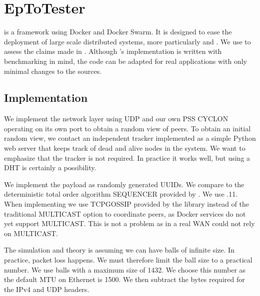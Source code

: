 \section{EpToTester}
\label{sec:epto}
\eptotester is a framework using Docker and Docker Swarm. It is designed to ease the deployment of large scale distributed systems, more particularly \jgroups and \epto. We use \eptotester to assess the claims made in \autocite{matos2015epto}. Although \epto's implementation is written with benchmarking in mind, the code can be adapted for real applications with only minimal changes to the sources.
\subsection{Implementation}
We implement the network layer using UDP and our own PSS CYCLON operating on its own port to obtain a random view of peers. To obtain an initial random view, we contact an independent tracker implemented as a simple Python web server that keeps track of dead and alive nodes in the system. We want to emphasize that the tracker is not required. In practice it works well, but using a DHT is certainly a possibility.

We implement the payload as randomly generated UUIDs. We compare \epto to the deterministic total order algorithm SEQUENCER provided by \jgroups. We use .11. When implementing \jgroups we use TCPGOSSIP \autocite{tcpgossip} provided by the \jgroups library instead of the traditional MULTICAST option to coordinate peers, as Docker services do not yet support MULTICAST. This is not a problem as in a real WAN \jgroups could not rely on MULTICAST.

The \epto simulation and theory is assuming we can have balls of infinite size. In practice, packet loss happens. We must therefore limit the ball size to a practical number. We use balls with a maximum size of \SI{1432}{\byte}. We choose this number as the default MTU on Ethernet is \SI{1500}{\byte}. We then subtract the bytes required for the IPv4 and UDP headers.
